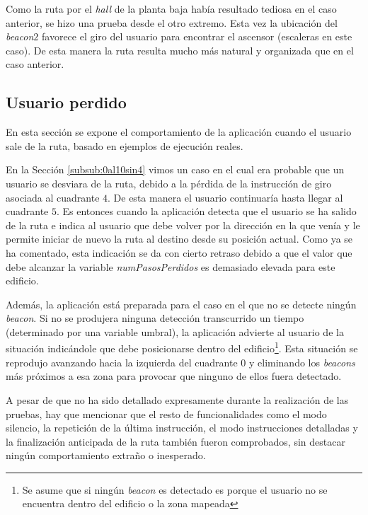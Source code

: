 Como la ruta por el \textit{hall} de la planta baja había resultado tediosa en el caso anterior, se hizo una prueba desde el otro extremo. Esta vez la ubicación del \textit{beacon$2$} favorece el giro del usuario para encontrar el ascensor (escaleras en este caso). De esta manera la ruta resulta mucho más natural y organizada que en el caso anterior.

\subsection{Usuario perdido}
\label{sub:usuarioPerdido}

En esta sección se expone el comportamiento de la aplicación cuando el usuario sale de la ruta, basado en ejemplos de ejecución reales. 

En la Sección \ref{subsub:0al10sin4} vimos un caso en el cual era probable que un usuario se desviara de la ruta, debido a la pérdida de la instrucción de giro asociada al cuadrante $4$. De esta manera el usuario continuaría hasta llegar al cuadrante $5$. Es entonces cuando la aplicación detecta que el usuario se ha salido de la ruta e indica al usuario que debe volver por la dirección en la que venía y le permite iniciar de nuevo la ruta al destino desde su posición actual. Como ya se ha comentado, esta indicación se da con cierto retraso debido a que el valor que debe alcanzar la variable \textit{numPasosPerdidos} es demasiado elevada para este edificio. 

Además, la aplicación está preparada para el caso en el que no se detecte ningún \textit{beacon}. Si no se produjera ninguna detección transcurrido un tiempo (determinado por una variable umbral), la aplicación advierte al usuario de la situación indicándole que debe posicionarse dentro del edificio\footnote{Se asume que si ningún \textit{beacon} es detectado es porque el usuario no se encuentra dentro del edificio o la zona mapeada}. Esta situación se reprodujo avanzando hacia la izquierda del cuadrante $0$ y eliminando los \textit{beacons} más próximos a esa zona para provocar que ninguno de ellos fuera detectado.

A pesar de que no ha sido detallado expresamente durante la realización de las pruebas, hay que mencionar que el resto de funcionalidades como el modo silencio, la repetición de la última instrucción, el modo instrucciones detalladas y la finalización anticipada de la ruta también fueron comprobados, sin destacar ningún comportamiento extraño o inesperado.

